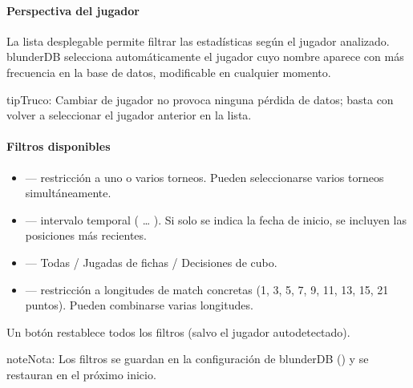\documentclass[letterpaper,10pt,spanish]{sphinxmanual}
\begin{document}
\paragraph{Perspectiva del jugador}
\label{\detokenize{manuel:perspective-joueur}}
\sphinxAtStartPar
La lista desplegable  permite filtrar las estadísticas según el jugador analizado. blunderDB selecciona automáticamente el jugador cuyo nombre aparece con más frecuencia en la base de datos, modificable en cualquier momento.

\begin{sphinxadmonition}{tip}{Truco:}
\sphinxAtStartPar
Cambiar de jugador no provoca ninguna pérdida de datos; basta con volver a seleccionar el jugador anterior en la lista.
\end{sphinxadmonition}


\paragraph{Filtros disponibles}
\label{\detokenize{manuel:filtres-disponibles}}\begin{itemize}
\item {} 
\sphinxAtStartPar
{} — restricción a uno o varios torneos. Pueden seleccionarse varios torneos simultáneamente.

\item {} 
\sphinxAtStartPar
{} — intervalo temporal ( … ). Si solo se indica la fecha de inicio, se incluyen las posiciones más recientes.

\item {} 
\sphinxAtStartPar
{} — Todas / Jugadas de fichas / Decisiones de cubo.

\item {} 
\sphinxAtStartPar
{} — restricción a longitudes de match concretas (1, 3, 5, 7, 9, 11, 13, 15, 21 puntos). Pueden combinarse varias longitudes.

\end{itemize}

\sphinxAtStartPar
Un botón  restablece todos los filtros (salvo el jugador autodetectado).

\begin{sphinxadmonition}{note}{Nota:}
\sphinxAtStartPar
Los filtros se guardan en la configuración de blunderDB () y se restauran en el próximo inicio.
\end{sphinxadmonition}
\end{document}
